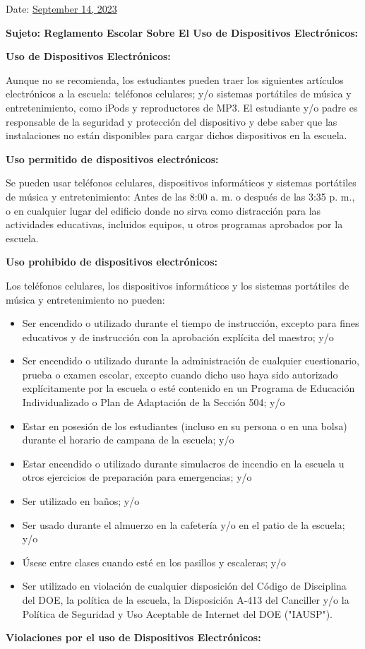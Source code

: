 \documentclass[12pt,letterpaper]{article}
\begin{document}
\vspace*{0.5in}
Date: \href{https://www.ps192.org/apps/bbmessages/show_bbm.jsp?REC_ID=139439}{September 14, 2023} 

\textbf{Sujeto: Reglamento Escolar Sobre El Uso de Dispositivos Electrónicos:}

\textbf{Uso de Dispositivos Electrónicos:}

Aunque no se recomienda, los estudiantes pueden traer los siguientes artículos electrónicos a 
la escuela: teléfonos celulares; y/o sistemas portátiles de música y entretenimiento, como 
iPods y reproductores de MP3. El estudiante y/o padre es responsable de la seguridad y 
protección del dispositivo y debe saber que las instalaciones no están disponibles para cargar
dichos dispositivos en la escuela.

\textbf{Uso permitido de dispositivos electrónicos:}

Se pueden usar teléfonos celulares, dispositivos informáticos y sistemas portátiles de música y entretenimiento: Antes de las 8:00 a. m. o después de las 3:35 p. m., o en cualquier lugar
del edificio donde no sirva como distracción para las actividades educativas, incluidos 
equipos, u otros programas aprobados por la escuela.

\textbf{Uso prohibido de dispositivos electrónicos:}

Los teléfonos celulares, los dispositivos informáticos y los sistemas portátiles de música y entretenimiento no pueden:
\begin{itemize}
\item Ser encendido o utilizado durante el tiempo de instrucción, excepto para fines educativos y de instrucción con la aprobación explícita del maestro; y/o 
\item Ser encendido o utilizado durante la administración de cualquier cuestionario, prueba o examen escolar, excepto cuando dicho uso haya sido autorizado explícitamente por la escuela o esté contenido en un Programa de Educación Individualizado o Plan de Adaptación de la Sección 504; y/o
\item Estar en posesión de los estudiantes (incluso en su persona o en una bolsa) durante el horario de campana de la escuela; y/o 
\item Estar encendido o utilizado durante simulacros de incendio en la escuela u otros ejercicios de preparación para emergencias; y/o
\item Ser utilizado en baños; y/o
\item Ser usado durante el almuerzo en la cafetería y/o en el patio de la escuela; y/o
\item Úsese entre clases cuando esté en los pasillos y escaleras; y/o
\pagebreak
\vspace*{2cm} 
\item Ser utilizado en violación de cualquier disposición del Código de Disciplina del DOE, la política de la escuela, la Disposición A-413 del Canciller y/o la Política de Seguridad y Uso Aceptable de Internet del DOE ("IAUSP").
\end{itemize}
\textbf{Violaciones por el uso de Dispositivos Electrónicos:}
\end{document}
